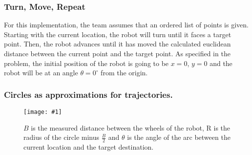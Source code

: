 \documentclass[12pt,conference,onecolumn]{article} %
\newcommand{\myfigure}[4]{
  \begin{figure}[h!]
      \centering
      \texttt{[image: \#1]}
      \caption{#2}
\label{#4}
    \end{figure}
}
\begin{document}
\subsubsection*{Turn, Move, Repeat}
For this implementation, the team assumes that an ordered list of points is given. Starting with the current location, the robot will turn until it faces a target point. Then, the robot advances until it has moved the calculated euclidean distance between the current point and the target point. As specified in the problem, the initial position of the robot is going to be $x=0$, $y=0$ and the robot will be at an angle $\theta=0^{\circ}$ from the origin.


\subsubsection*{Circles as approximations for trajectories.}
\myfigure{images/robotCircle.png}{$B$ is the measured distance between the wheels 
of the robot, R is the radius of the circle minus $\frac{B}{2}$ and $\theta$ is the angle of the arc between the current location and the target destination.}{0.5}{fig:robotCircle}
\end{document}
